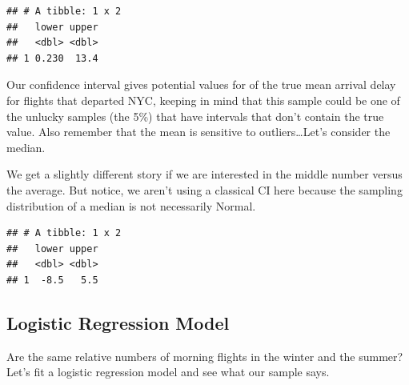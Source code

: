 \documentclass[]{book}
\newenvironment{Shaded}{\begin{snugshade}}{\end{snugshade}}
\newcommand{\DataTypeTok}[1]{\textcolor[rgb]{0.13,0.29,0.53}{#1}}
\newcommand{\DecValTok}[1]{\textcolor[rgb]{0.00,0.00,0.81}{#1}}
\newcommand{\KeywordTok}[1]{\textcolor[rgb]{0.13,0.29,0.53}{\textbf{#1}}}
\newcommand{\NormalTok}[1]{#1}
\newcommand{\OperatorTok}[1]{\textcolor[rgb]{0.81,0.36,0.00}{\textbf{#1}}}
\newcommand{\StringTok}[1]{\textcolor[rgb]{0.31,0.60,0.02}{#1}}
\begin{document}
\begin{verbatim}
## # A tibble: 1 x 2
##   lower upper
##   <dbl> <dbl>
## 1 0.230  13.4
\end{verbatim}

Our confidence interval gives potential values for of the true mean arrival delay for flights that departed NYC, keeping in mind that this sample could be one of the unlucky samples (the 5\%) that have intervals that don't contain the true value. Also remember that the mean is sensitive to outliers\ldots{}Let's consider the median.

We get a slightly different story if we are interested in the middle number versus the average. But notice, we aren't using a classical CI here because the sampling distribution of a median is not necessarily Normal.

\begin{Shaded}
\end{Shaded}

\begin{verbatim}
## # A tibble: 1 x 2
##   lower upper
##   <dbl> <dbl>
## 1  -8.5   5.5
\end{verbatim}

\hypertarget{logistic-regression-model}{%
\subsection{Logistic Regression Model}\label{logistic-regression-model}}

Are the same relative numbers of morning flights in the winter and the summer? Let's fit a logistic regression model and see what our sample says.

\begin{Shaded}
\end{Shaded}
\end{document}
